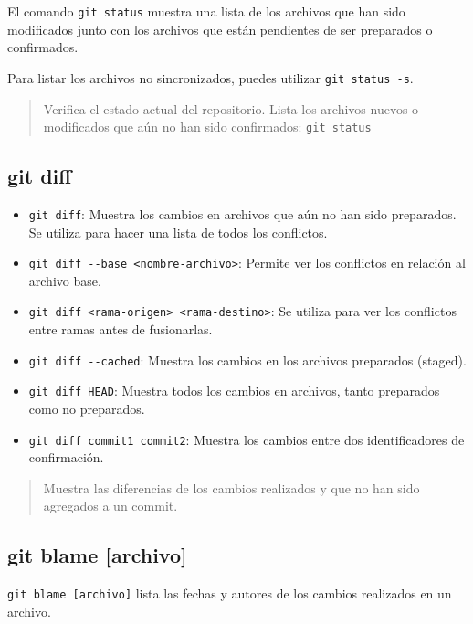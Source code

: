 \documentclass[
  a4paper,
]{article}
\begin{document}
El comando \texttt{git\ status} muestra una lista de los archivos que
han sido modificados junto con los archivos que están pendientes de ser
preparados o confirmados.

Para listar los archivos no sincronizados, puedes utilizar
\texttt{git\ status\ -s}.

\begin{quote}
Verifica el estado actual del repositorio. Lista los archivos nuevos o
modificados que aún no han sido confirmados: \texttt{git\ status}
\end{quote}

\subsection{git diff}\label{git-diff}

\begin{itemize}
\item
  \texttt{git\ diff}: Muestra los cambios en archivos que aún no han
  sido preparados. Se utiliza para hacer una lista de todos los
  conflictos.
\item
  \texttt{git\ diff\ -\/-base\ \textless{}nombre-archivo\textgreater{}}:
  Permite ver los conflictos en relación al archivo base.
\item
  \texttt{git\ diff\ \textless{}rama-origen\textgreater{}\ \textless{}rama-destino\textgreater{}}:
  Se utiliza para ver los conflictos entre ramas antes de fusionarlas.
\item
  \texttt{git\ diff\ -\/-cached}: Muestra los cambios en los archivos
  preparados (staged).
\item
  \texttt{git\ diff\ HEAD}: Muestra todos los cambios en archivos, tanto
  preparados como no preparados.
\item
  \texttt{git\ diff\ commit1\ commit2}: Muestra los cambios entre dos
  identificadores de confirmación.
\end{itemize}

\begin{quote}
Muestra las diferencias de los cambios realizados y que no han sido
agregados a un commit.
\end{quote}

\subsection{git blame {[}archivo{]}}\label{git-blame-archivo}

\texttt{git\ blame\ {[}archivo{]}} lista las fechas y autores de los
cambios realizados en un archivo.
\end{document}
